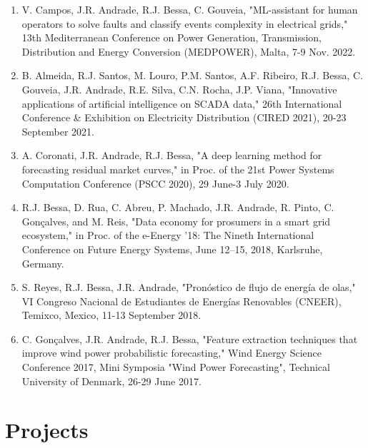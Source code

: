 \documentclass{mycv}
\begin{document}
\begin{enumerate}
	
	\item V. Campos, J.R. Andrade, R.J. Bessa, C. Gouveia, "ML-assistant for human operators to solve faults and classify events complexity in electrical grids," 13th Mediterranean Conference on Power Generation, Transmission, Distribution and Energy Conversion (MEDPOWER), Malta, 7-9 Nov. 2022.
	
	\item B. Almeida, R.J. Santos, M. Louro, P.M. Santos, A.F. Ribeiro, R.J. Bessa, C. Gouveia, J.R. Andrade, R.E. Silva, C.N. Rocha, J.P. Viana, "Innovative applications of artificial intelligence on SCADA data," 26th International Conference \& Exhibition on Electricity Distribution (CIRED 2021), 20-23 September 2021.

	\item A. Coronati, J.R. Andrade, R.J. Bessa, "A deep learning method for forecasting residual market curves," in Proc. of the 21st Power Systems Computation Conference (PSCC 2020), 29 June-3 July 2020.

	\item R.J. Bessa, D. Rua, C. Abreu, P. Machado, J.R. Andrade, R. Pinto, C. Gonçalves, and M. Reis, "Data economy for prosumers in a smart grid ecosystem," in Proc. of the e-Energy ’18: The Nineth International Conference on Future Energy Systems, June 12–15, 2018, Karlsruhe, Germany.
	
	\item S. Reyes, R.J. Bessa, J.R. Andrade, "Pronóstico de flujo de energía de olas," VI Congreso Nacional de Estudiantes de Energías Renovables (CNEER), Temixco, Mexico, 11-13 September 2018.
	
	\item C. Gonçalves, J.R. Andrade, R.J. Bessa, "Feature extraction techniques that improve wind power probabilistic forecasting," Wind Energy Science Conference 2017, Mini Symposia "Wind Power Forecasting", Technical University of Denmark, 26-29 June 2017.

\end{enumerate}


\section{Projects}

	\vspace{0.15cm}	
\end{document}
